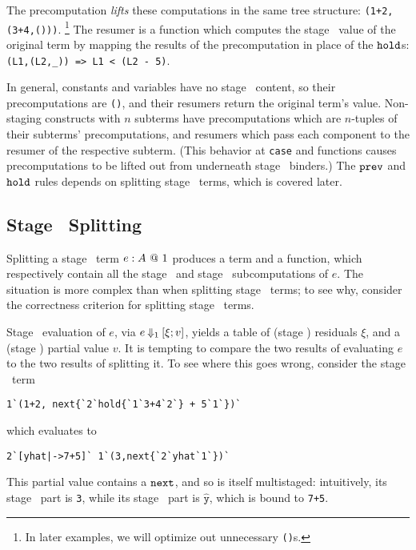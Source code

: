 
The precomputation \emph{lifts} these computations in the same tree
structure: \verb|(1+2,(3+4,()))|.%
\footnote{In later examples, we will optimize out unnecessary \texttt{()}s.}
The resumer is a function which computes the stage \bbtwo\ value of the original
term by mapping the results of the precomputation in place of the ${\tt hold}$s:
\verb|(L1,(L2,_)) => L1 < (L2 - 5)|. 


In general, constants and variables have no stage \bbone\ content, so their
precomputations are \texttt{()}, and their resumers return the original term's
value. Non-staging constructs with $n$ subterms have precomputations which are
$n$-tuples of their subterms' precomputations, and resumers which pass each
component to the resumer of the respective subterm. (This behavior at
\texttt{case} and functions causes precomputations to be lifted out from
underneath stage \bbtwo\ binders.) The ${\tt prev}$ and ${\tt hold}$ rules depends on
splitting stage \bbone\ terms, which is covered later.

\subsection{Stage \bbone\ Splitting}

Splitting a stage \bbone\ term ${e}:{A}~@~ 1$ produces a term and a function,
which respectively contain all the stage \bbone\ and stage \bbtwo\
subcomputations of $e$. The situation is more complex than when splitting stage
\bbtwo\ terms; to see why, consider the correctness criterion for splitting
stage \bbone\ terms.

Stage \bbone\ evaluation of $e$, via $e\mathbin{{\Downarrow_{ 1}}}[\xi;v]$,
yields a table of (stage \bbtwo) residuals $\xi$, and a (stage \bbone) partial
value $v$. It is tempting to compare the two results of evaluating $e$ to the
two results of splitting it. To see where this goes wrong, consider the stage
\bbone\ term
\begin{lstlisting}
1`(1+2, next{`2`hold{`1`3+4`2`} + 5`1`})`
\end{lstlisting}
which evaluates to
\begin{lstlisting}
2`[yhat|->7+5]` 1`(3,next{`2`yhat`1`})`
\end{lstlisting}
This partial value contains a ${\tt next}$, and so is itself multistaged:
intuitively, its stage \bbone\ part is \texttt{3}, while its stage \bbtwo\ part
is $\mathtt{\hat{y}}$, which is bound to \texttt{7+5}.


